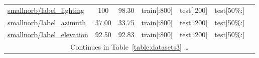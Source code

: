 \documentclass{article} \usepackage{iclr2023_conference,times}
\begin{document}
\begin{table*}[h]
\begin{tabular}{lcccccc}
\\
\href{https://www.tensorflow.org/datasets/catalog/smallnorb}{smallnorb/label\_lighting}
 &  100  &  98.30
& train[{\tiny:800}] & test[{\tiny:200}] & test[{\tiny50\%:}]
& \citep{LeCun2004LearningMF}
\\
\href{https://www.tensorflow.org/datasets/catalog/smallnorb}{smallnorb/label\_azimuth}
&  37.00  &  33.75
& train[{\tiny:800}] & test[{\tiny:200}] & test[{\tiny50\%:}]
& \citep{LeCun2004LearningMF}
\\
\href{https://www.tensorflow.org/datasets/catalog/smallnorb}{smallnorb/label\_elevation}
&  92.50  &  92.83
& train[{\tiny:800}] & test[{\tiny:200}] & test[{\tiny50\%:}]
& \citep{LeCun2004LearningMF}
\\
\midrule
\multicolumn{7}{c}{Continues in Table~\ref{table:datasets3} \dots}  \\

    \bottomrule
  \end{tabular}
\end{table*}

\clearpage
\end{document}
